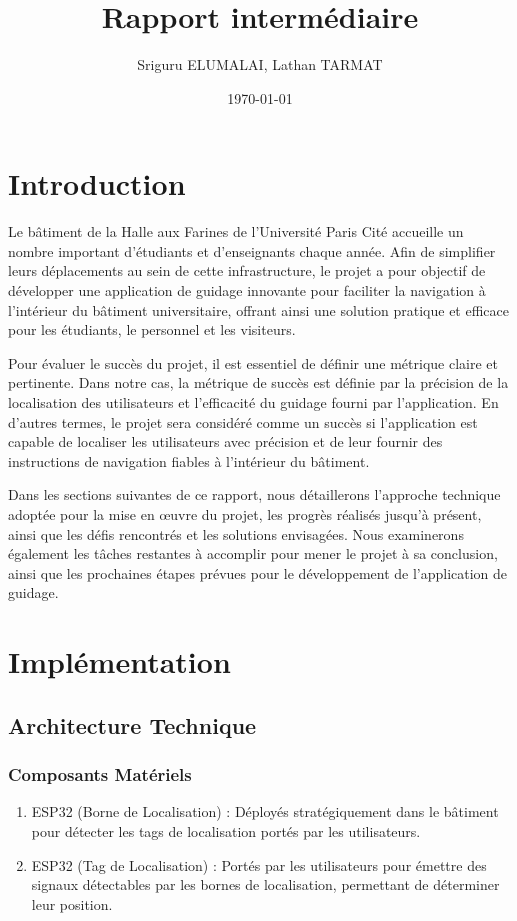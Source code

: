 \documentclass{article}
\title{Rapport intermédiaire}
\author{Sriguru ELUMALAI, Lathan TARMAT}
\date{\today}
\begin{document}
\maketitle

\section{Introduction}

Le bâtiment de la Halle aux Farines de l'Université Paris Cité accueille un nombre important d'étudiants et d'enseignants chaque année. Afin de simplifier leurs déplacements au sein de cette infrastructure, le projet a pour objectif de développer une application de guidage innovante pour faciliter la navigation à l'intérieur du bâtiment universitaire, offrant ainsi une solution pratique et efficace pour les étudiants, le personnel et les visiteurs.

Pour évaluer le succès du projet, il est essentiel de définir une métrique claire et pertinente. Dans notre cas, la métrique de succès est définie par la précision de la localisation des utilisateurs et l'efficacité du guidage fourni par l'application. En d'autres termes, le projet sera considéré comme un succès si l'application est capable de localiser les utilisateurs avec précision et de leur fournir des instructions de navigation fiables à l'intérieur du bâtiment.

Dans les sections suivantes de ce rapport, nous détaillerons l'approche technique adoptée pour la mise en œuvre du projet, les progrès réalisés jusqu'à présent, ainsi que les défis rencontrés et les solutions envisagées. Nous examinerons également les tâches restantes à accomplir pour mener le projet à sa conclusion, ainsi que les prochaines étapes prévues pour le développement de l'application de guidage.

\section{Implémentation}

\subsection{Architecture Technique}

\subsubsection{Composants Matériels}
\begin{enumerate}
    \item ESP32 (Borne de Localisation) : Déployés stratégiquement dans le bâtiment pour détecter les tags de localisation portés par les utilisateurs.
    \item ESP32 (Tag de Localisation) : Portés par les utilisateurs pour émettre des signaux détectables par les bornes de localisation, permettant de déterminer leur position.
\end{enumerate}
\end{document}
